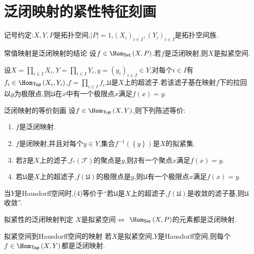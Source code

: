 \section{泛闭映射的紧性特征刻画}

记号约定:$X,Y,P$是拓扑空间,$\left|P\right|=1$,$\left(X_{i}\right)_{i\in I},\left(Y_{i}\right)_{i\in I}$是拓扑空间族.

\begin{lemma}{常值映射是泛闭映射的结论}{}
	设$f\in\Hom_{\mathsf{Set}}\left(X,P\right)$.若$f$是泛闭映射,则$X$是拟紧空间.
\end{lemma}

\begin{lemma}{}{}
	设$X=\prod\limits_{i\in I}X_{i},Y=\prod\limits_{i\in I}Y_{i},y=\left(y_{i}\right)_{i\in I}\in Y$,对每个$i\in I$有$f_{i}\in\Hom_{\mathsf{Top}}\left(X_{i},Y_{i}\right)$,$f=\prod\limits_{i\in I}f_{i}$,$\mathfrak{U}$是$X$上的超滤子.若该滤子基在映射$f$下的拉回以$y$为极限点,则$\mathfrak{U}$在$x$中有一个极限点$x$满足$f\left(x\right)=y$.
\end{lemma}

\begin{theorem}{泛闭映射的等价刻画}{}
	设$f\in\Hom_{\mathsf{Top}}\left(X,Y\right)$,则下列陈述等价:
	\begin{enumerate}
		\item $f$是泛闭映射.
		\item $f$是闭映射,并且对每个$y\in Y$,集合$f^{-1}\left(\left\{y\right\}\right)$是$X$的拟紧集.
		\item 若$\mathfrak{F}$是$X$上的滤子,$f_{\ast}\left(\mathcal{F}\right)$的聚点是$y$,则$\mathfrak{F}$有一个聚点$x$满足$f\left(x\right)=y$.
		\item 若$\mathfrak{U}$是$X$上的超滤子,$f\left(\mathfrak{U}\right)$的极限点是$y$,则$\mathfrak{U}$有一个极限点$x$满足$f\left(x\right)=y$.
	\end{enumerate}
\end{theorem}

\begin{remark}{}{}
	当$Y$是Hausdorff空间时,(4)等价于``若$\mathfrak{U}$是$X$上的超滤子,$f\left(\mathfrak{U}\right)$是收敛的滤子基,则$\mathfrak{U}$收敛''.
\end{remark}

\begin{corollary}{拟紧性的泛闭映射判定}{}
	$X$是拟紧空间$\iff$ $\Hom_{\mathsf{Set}}\left(X,P\right)$的元素都是泛闭映射.
\end{corollary}

\begin{corollary}{拟紧空间到Hausdorff空间的映射}{}
	若$X$是拟紧空间,$Y$是Hausdorff空间,则每个$f\in\Hom_{\mathsf{Top}}\left(X,Y\right)$都是泛闭映射.
\end{corollary}

